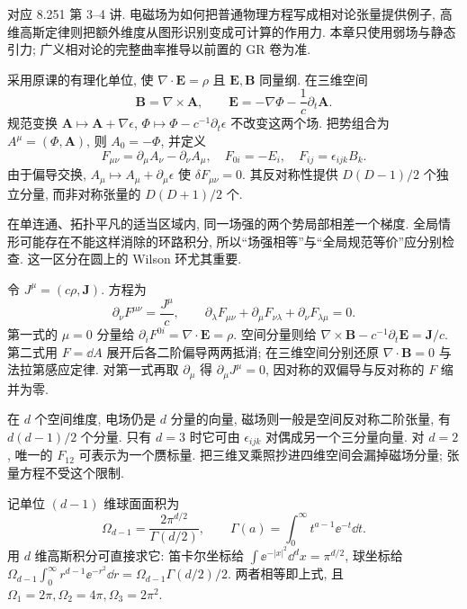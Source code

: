 \label{ch:basic-fields}
对应 8.251 第 3--4 讲. 电磁场为如何把普通物理方程写成相对论张量提供例子, 高维高斯定律则把额外维度从图形识别变成可计算的作用力. 本章只使用弱场与静态引力; 广义相对论的完整曲率推导以前置的 GR 卷为准.

采用原课的有理化单位, 使 $\nabla\cdot\boldsymbol E=\rho$ 且 $\boldsymbol E,\boldsymbol B$ 同量纲. 在三维空间
\[
 \boldsymbol B=\nabla\times\boldsymbol A,\qquad
 \boldsymbol E=-\nabla\Phi-\frac1c\partial_t\boldsymbol A.
\]
规范变换 $\boldsymbol A\mapsto\boldsymbol A+\nabla\epsilon$,
$\Phi\mapsto\Phi-c^{-1}\partial_t\epsilon$ 不改变这两个场. 把势组合为 $A^\mu=(\Phi,\boldsymbol A)$, 则 $A_0=-\Phi$, 并定义
\[
 F_{\mu\nu}=\partial_\mu A_\nu-\partial_\nu A_\mu,
 \quad F_{0i}=-E_i,\quad F_{ij}=\epsilon_{ijk}B_k.
\]
由于偏导交换, $A_\mu\mapsto A_\mu+\partial_\mu\epsilon$ 使 $\delta F_{\mu\nu}=0$. 其反对称性提供 $D(D-1)/2$ 个独立分量, 而非对称张量的 $D(D+1)/2$ 个.

在单连通、拓扑平凡的适当区域内, 同一场强的两个势局部相差一个梯度. 全局情形可能存在不能这样消除的环路积分, 所以“场强相等”与“全局规范等价”应分别检查. 这一区分在圆上的 Wilson 环尤其重要.

令 $J^\mu=(c\rho,\boldsymbol J)$. 方程为
\[
 \partial_\nu F^{\mu\nu}=\frac{J^\mu}{c},\qquad
 \partial_\lambda F_{\mu\nu}+\partial_\mu F_{\nu\lambda}
 +\partial_\nu F_{\lambda\mu}=0.
\]
第一式的 $\mu=0$ 分量给 $\partial_iF^{0i}=\nabla\cdot\boldsymbol E=\rho$. 空间分量则给 $\nabla\times\boldsymbol B-c^{-1}\partial_t\boldsymbol E=\boldsymbol J/c$. 第二式用 $F=\dd A$ 展开后各二阶偏导两两抵消; 在三维空间分别还原 $\nabla\cdot\boldsymbol B=0$ 与法拉第感应定律. 对第一式再取 $\partial_\mu$ 得 $\partial_\mu J^\mu=0$, 因对称的双偏导与反对称的 $F$ 缩并为零.

在 $d$ 个空间维度, 电场仍是 $d$ 分量的向量, 磁场则一般是空间反对称二阶张量, 有 $d(d-1)/2$ 个分量. 只有 $d=3$ 时它可由 $\epsilon_{ijk}$ 对偶成另一个三分量向量. 对 $d=2$, 唯一的 $F_{12}$ 可表示为一个赝标量. 把三维叉乘照抄进四维空间会漏掉磁场分量; 张量方程不受这个限制.

记单位 $(d-1)$ 维球面面积为
\[
 \Omega_{d-1}=\frac{2\pi^{d/2}}{\Gamma(d/2)},\qquad
 \Gamma(a)=\int_0^\infty t^{a-1}\ee^{-t}\dd t.
\]
用 $d$ 维高斯积分可直接求它: 笛卡尔坐标给 $\int\ee^{-|x|^2}\dd^dx=\pi^{d/2}$, 球坐标给 $\Omega_{d-1}\int_0^\infty r^{d-1}\ee^{-r^2}\dd r=\Omega_{d-1}\Gamma(d/2)/2$. 两者相等即上式, 且 $\Omega_1=2\pi,\Omega_2=4\pi,\Omega_3=2\pi^2$.

